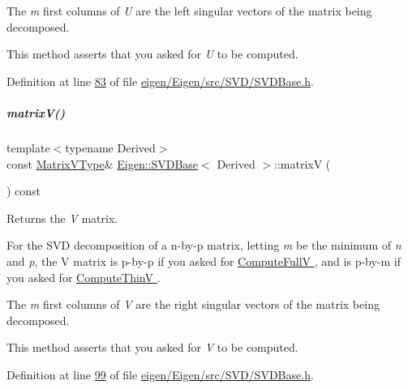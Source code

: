 The {\itshape m} first columns of {\itshape U} are the left singular vectors of the matrix being decomposed.

This method asserts that you asked for {\itshape U} to be computed. 

Definition at line \hyperlink{eigen_2_eigen_2src_2_s_v_d_2_s_v_d_base_8h_source_l00083}{83} of file \hyperlink{eigen_2_eigen_2src_2_s_v_d_2_s_v_d_base_8h_source}{eigen/\+Eigen/src/\+S\+V\+D/\+S\+V\+D\+Base.\+h}.

\mbox{\label{group___s_v_d___module_a245a453b5e7347f737295c23133238c4}} 
\subparagraph{\texorpdfstring{matrix\+V()}{matrixV()}\hspace{0.1cm}{\footnotesize\ttfamily [1/2]}}
{\footnotesize\ttfamily template$<$typename Derived$>$ \\
const \hyperlink{group___core___module}{Matrix\+V\+Type}\& \hyperlink{group___s_v_d___module_class_eigen_1_1_s_v_d_base}{Eigen\+::\+S\+V\+D\+Base}$<$ Derived $>$\+::matrixV (\begin{DoxyParamCaption}{ }\end{DoxyParamCaption}) const\hspace{0.3cm}{\ttfamily [inline]}}

\begin{DoxyReturn}{Returns}
the {\itshape V} matrix.
\end{DoxyReturn}
For the S\+VD decomposition of a n-\/by-\/p matrix, letting {\itshape m} be the minimum of {\itshape n} and {\itshape p}, the V matrix is p-\/by-\/p if you asked for \hyperlink{group__enums_ggae3e239fb70022eb8747994cf5d68b4a9a52c6f7e80bbf9a42297c88f700245b51}{Compute\+FullV }, and is p-\/by-\/m if you asked for \hyperlink{group__enums_ggae3e239fb70022eb8747994cf5d68b4a9a1055e53fa95c8ae04a07ebb72cfafd95}{Compute\+ThinV }.

The {\itshape m} first columns of {\itshape V} are the right singular vectors of the matrix being decomposed.

This method asserts that you asked for {\itshape V} to be computed. 

Definition at line \hyperlink{eigen_2_eigen_2src_2_s_v_d_2_s_v_d_base_8h_source_l00099}{99} of file \hyperlink{eigen_2_eigen_2src_2_s_v_d_2_s_v_d_base_8h_source}{eigen/\+Eigen/src/\+S\+V\+D/\+S\+V\+D\+Base.\+h}.


